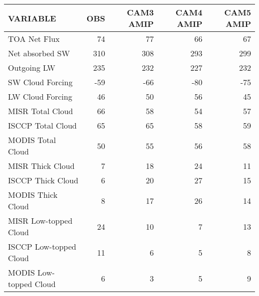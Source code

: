 \begin{tabular}{lrrrr}
\hline
                VARIABLE &                      OBS &                CAM3 AMIP &                CAM4 AMIP &                CAM5 AMIP \\ \hline
            TOA Net Flux &                       74 &                       77 &                       66 &                       67 \\
         Net absorbed SW &                      310 &                      308 &                      293 &                      299 \\
             Outgoing LW &                      235 &                      232 &                      227 &                      232 \\
        SW Cloud Forcing &                      -59 &                      -66 &                      -80 &                      -75 \\
        LW Cloud Forcing &                       46 &                       50 &                       56 &                       45 \\
        MISR Total Cloud &                       66 &                       58 &                       54 &                       57 \\
       ISCCP Total Cloud &                       65 &                       65 &                       58 &                       59 \\
       MODIS Total Cloud &                       50 &                       55 &                       56 &                       58 \\
        MISR Thick Cloud &                        7 &                       18 &                       24 &                       11 \\
       ISCCP Thick Cloud &                        6 &                       20 &                       27 &                       15 \\
       MODIS Thick Cloud &                        8 &                       17 &                       26 &                       14 \\
   MISR Low-topped Cloud &                       24 &                       10 &                        7 &                       13 \\
  ISCCP Low-topped Cloud &                       11 &                        6 &                        5 &                        8 \\
  MODIS Low-topped Cloud &                        6 &                        3 &                        5 &                        9 \\

\end{tabular}
